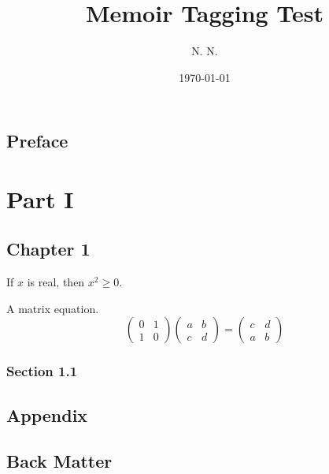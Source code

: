 \documentclass{memoir-tagging}
\title{Memoir Tagging Test}
\author{N. N.}
\date{\today}
\begin{document}
\frontmatter

\maketitle

\chapter{Preface}

\lipsum

\tableofcontents

\mainmatter

\part{Part I}

\chapter{Chapter 1}

If $x$ is real, then $x^{2} \geq 0$.

A matrix equation.
\[
\begin{pmatrix}0&1\\1&0\end{pmatrix}
\begin{pmatrix}a&b\\c&d\end{pmatrix}
=
\begin{pmatrix}c&d\\a&b\end{pmatrix}
\]

\section{Section 1.1}

\lipsum

\appendix

\chapter{Appendix}

\lipsum

\backmatter

\chapter{Back Matter}

\lipsum
\end{document}
